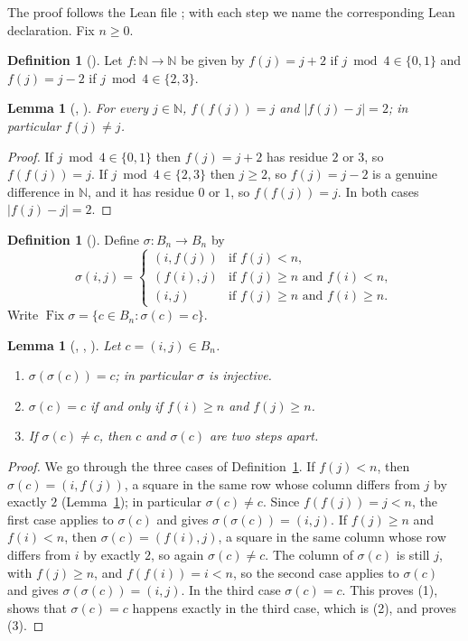 \documentclass[11pt]{amsart}
\theoremstyle{plain}
\newtheorem{lemma}[theorem]{Lemma}
\theoremstyle{definition}
\newtheorem{definition}[theorem]{Definition}
\newcommand{\N}{\mathbb{N}}
\newcommand{\Fix}{\operatorname{Fix}}
\newcommand{\B}{B_n}
\begin{document}
The proof follows the Lean file ; with each step we name the corresponding Lean declaration. Fix $n\ge0$.

\begin{definition}[]\label{def:f}
Let $f\colon\N\to\N$ be given by $f(j)=j+2$ if $j\bmod 4\in\{0,1\}$ and $f(j)=j-2$ if $j\bmod4\in\{2,3\}$.
\end{definition}

\begin{lemma}[, ]\label{lem:f}
For every $j\in\N$, $f(f(j))=j$ and $|f(j)-j|=2$; in particular $f(j)\ne j$.
\end{lemma}

\begin{proof}
If $j\bmod4\in\{0,1\}$ then $f(j)=j+2$ has residue $2$ or $3$, so $f(f(j))=j$. If $j\bmod4\in\{2,3\}$ then $j\ge2$, so $f(j)=j-2$ is a genuine difference in $\N$, and it has residue $0$ or $1$, so $f(f(j))=j$. In both cases $|f(j)-j|=2$.
\end{proof}

\begin{definition}[]\label{def:sigma}
Define $\sigma\colon\B\to\B$ by
\[
  \sigma(i,j)=\begin{cases}
    (i,f(j)) & \text{if } f(j)<n,\\
    (f(i),j) & \text{if } f(j)\ge n \text{ and } f(i)<n,\\
    (i,j) & \text{if } f(j)\ge n \text{ and } f(i)\ge n.
  \end{cases}
\]
Write $\Fix\sigma=\{c\in\B:\sigma(c)=c\}$.
\end{definition}

\begin{lemma}[, , ]\label{lem:sigma}
Let $c=(i,j)\in\B$.
\begin{enumerate}
\item $\sigma(\sigma(c))=c$; in particular $\sigma$ is injective.
\item $\sigma(c)=c$ if and only if $f(i)\ge n$ and $f(j)\ge n$.
\item If $\sigma(c)\ne c$, then $c$ and $\sigma(c)$ are two steps apart.
\end{enumerate}
\end{lemma}

\begin{proof}
We go through the three cases of Definition~\ref{def:sigma}.
If $f(j)<n$, then $\sigma(c)=(i,f(j))$, a square in the same row whose column differs from $j$ by exactly $2$ (Lemma~\ref{lem:f}); in particular $\sigma(c)\ne c$. Since $f(f(j))=j<n$, the first case applies to $\sigma(c)$ and gives $\sigma(\sigma(c))=(i,j)$.
If $f(j)\ge n$ and $f(i)<n$, then $\sigma(c)=(f(i),j)$, a square in the same column whose row differs from $i$ by exactly $2$, so again $\sigma(c)\ne c$. The column of $\sigma(c)$ is still $j$, with $f(j)\ge n$, and $f(f(i))=i<n$, so the second case applies to $\sigma(c)$ and gives $\sigma(\sigma(c))=(i,j)$.
In the third case $\sigma(c)=c$. This proves (1), shows that $\sigma(c)=c$ happens exactly in the third case, which is (2), and proves (3).
\end{proof}
\end{document}
